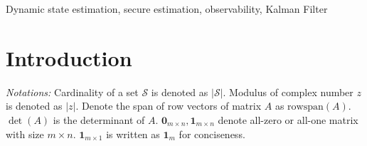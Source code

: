 \documentclass[journal]{IEEEtran}
\newcommand{\Sc}{{\mathcal{S}}}
\newcommand{\rs}{\text{rowspan}}
\begin{document}
	
	
	
	
	
	
	
	
	
	\maketitle
	
	\begin{abstract}
		...
	\end{abstract}
	
	\begin{IEEEkeywords}
		Dynamic state estimation, secure estimation, observability, Kalman Filter
	\end{IEEEkeywords}
	
	
	
	
	
	
	
	
	
	\section{Introduction}
	
	\textit{Notations:}
	Cardinality of a set $\Sc$ is denoted as $|\Sc|$. Modulus of complex number $z$ is denoted as $|z|$. Denote the span of row vectors of matrix $A$ as $\rs(A)$. $\det(A)$ is the determinant of $A$. $\mathbf{0}_{m\times n}, \mathbf{1}_{m\times n}$ denote all-zero or all-one matrix with size $m\times n$. $\mathbf{1}_{m\times1}$ is written as $\mathbf{1}_{m}$ for conciseness.
	
\end{document}
